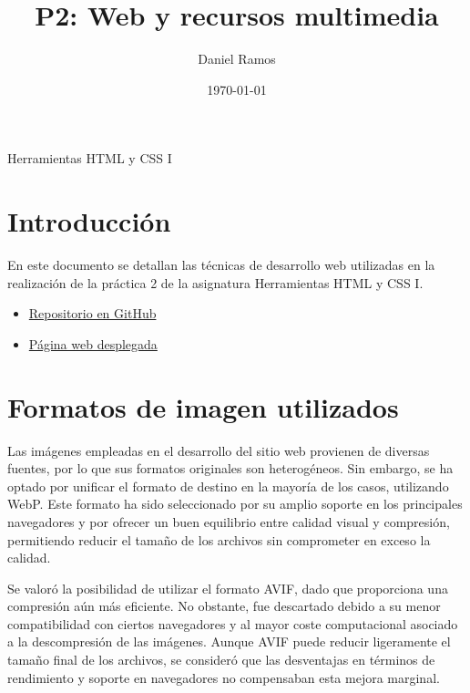 \documentclass{article}
\title{P2: Web y recursos multimedia}
\author{Daniel Ramos}
\date{\today}
\begin{document}
\maketitle

\begin{center}
    \large Herramientas HTML y CSS I
\end{center}

\newpage

\tableofcontents

\newpage

\section*{Introducción}

En este documento se detallan las técnicas de desarrollo web utilizadas en la realización de la práctica 2 de la asignatura Herramientas HTML y CSS I.

\begin{itemize}
    \item \href{https://github.com/DanielRamosAcosta/hhyc-dramosac}{Repositorio en GitHub}
    \item \href{https://www.danielramos.me/hhyc-dramosac}{Página web desplegada}
\end{itemize}

\newpage

\section{Formatos de imagen utilizados}\label{sec:formatos-de-imagen-utilizados}

Las imágenes empleadas en el desarrollo del sitio web provienen de diversas fuentes, por lo que sus formatos originales son heterogéneos. Sin embargo, se ha optado por unificar el formato de destino en la mayoría de los casos, utilizando WebP. Este formato ha sido seleccionado por su amplio soporte en los principales navegadores y por ofrecer un buen equilibrio entre calidad visual y compresión, permitiendo reducir el tamaño de los archivos sin comprometer en exceso la calidad.

Se valoró la posibilidad de utilizar el formato AVIF, dado que proporciona una compresión aún más eficiente. No obstante, fue descartado debido a su menor compatibilidad con ciertos navegadores y al mayor coste computacional asociado a la descompresión de las imágenes. Aunque AVIF puede reducir ligeramente el tamaño final de los archivos, se consideró que las desventajas en términos de rendimiento y soporte en navegadores no compensaban esta mejora marginal.
\end{document}
